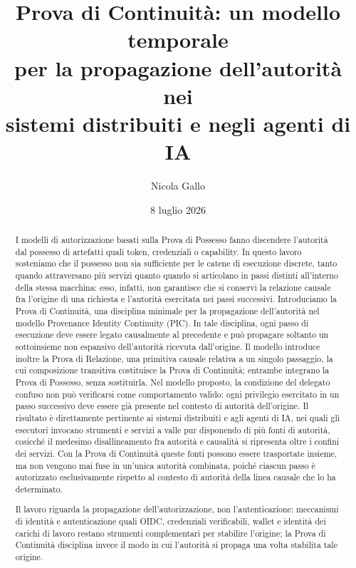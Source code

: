 \documentclass[11pt]{article}
\title{Prova di Continuità: un modello temporale\\
per la propagazione dell'autorità nei\\
sistemi distribuiti e negli agenti di IA}
\author{Nicola Gallo}
\date{8 luglio 2026}
\begin{document}
\maketitle

\begin{abstract}
I modelli di autorizzazione basati sulla Prova di Possesso fanno discendere
l'autorità dal possesso di artefatti quali token, credenziali o capability. In
questo lavoro sosteniamo che il possesso non sia sufficiente per le catene di
esecuzione discrete, tanto quando attraversano più servizi quanto quando si
articolano in passi distinti all'interno della stessa macchina: esso, infatti,
non garantisce che si conservi la relazione causale fra l'origine di una
richiesta e l'autorità esercitata nei passi successivi. Introduciamo la Prova di
Continuità, una disciplina minimale per la propagazione dell'autorità nel
modello Provenance Identity Continuity (PIC). In tale disciplina, ogni passo di
esecuzione deve essere legato causalmente al precedente e può propagare soltanto
un sottoinsieme non espansivo dell'autorità ricevuta dall'origine. Il modello
introduce inoltre la Prova di Relazione, una primitiva causale relativa a un
singolo passaggio, la cui composizione transitiva costituisce la Prova di
Continuità; entrambe integrano la Prova di Possesso, senza sostituirla. Nel
modello proposto, la condizione del delegato confuso non può verificarsi come
comportamento valido: ogni privilegio esercitato in un passo successivo deve
essere già presente nel contesto di autorità dell'origine. Il risultato è
direttamente pertinente ai sistemi distribuiti e agli agenti di IA, nei quali
gli esecutori invocano strumenti e servizi a valle pur disponendo di più fonti
di autorità, cosicché il medesimo disallineamento fra autorità e causalità si
ripresenta oltre i confini dei servizi. Con la Prova di Continuità queste fonti
possono essere trasportate insieme, ma non vengono mai fuse in un'unica autorità
combinata, poiché ciascun passo è autorizzato esclusivamente rispetto al
contesto di autorità della linea causale che lo ha determinato.

Il lavoro riguarda la propagazione dell'autorizzazione, non l'autenticazione:
meccanismi di identità e autenticazione quali OIDC, credenziali verificabili,
wallet e identità dei carichi di lavoro restano strumenti complementari per
stabilire l'origine; la Prova di Continuità disciplina invece il modo in cui
l'autorità si propaga una volta stabilita tale origine.
\end{abstract}
\end{document}
